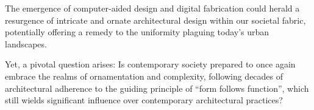 


The emergence of computer-aided design and digital fabrication could herald a resurgence of intricate and ornate architectural design within our societal fabric, potentially offering a remedy to the uniformity plaguing today's urban landscapes.

Yet, a pivotal question arises: Is contemporary society prepared to once again embrace the realms of ornamentation and complexity, following decades of architectural adherence to the guiding principle of ``form follows function''\cite{Gage2015}, which still wields significant influence over contemporary architectural practices?

